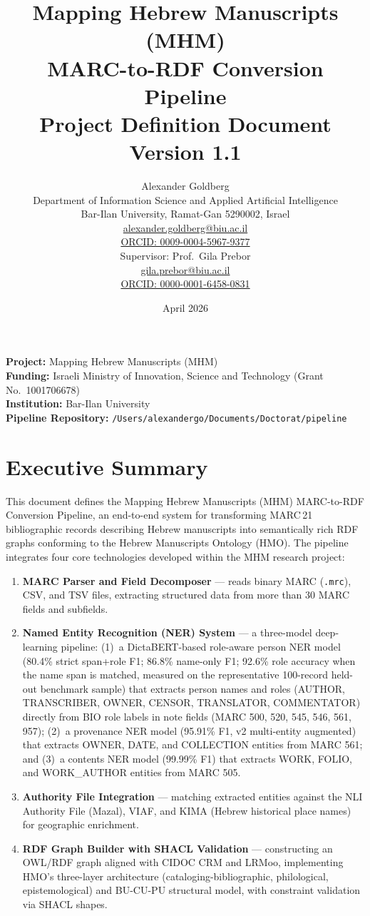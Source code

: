 \documentclass[12pt]{article}
\title{%
  \vspace{-1cm}
  {\LARGE\bfseries Mapping Hebrew Manuscripts (MHM)}\\[0.5cm]
  {\LARGE\bfseries MARC-to-RDF Conversion Pipeline}\\[0.5cm]
  {\Large Project Definition Document}\\[1cm]
  {\large Version 1.1}
}
\author{
  Alexander Goldberg\\
  Department of Information Science and Applied Artificial Intelligence\\
  Bar-Ilan University, Ramat-Gan 5290002, Israel\\[4pt]
  \href{mailto:alexander.goldberg@biu.ac.il}{alexander.goldberg@biu.ac.il}\\
  \href{https://orcid.org/0009-0004-5967-9377}{ORCID: 0009-0004-5967-9377}\\[0.5cm]
  Supervisor: Prof.\ Gila Prebor\\
  \href{mailto:gila.prebor@biu.ac.il}{gila.prebor@biu.ac.il}\\
  \href{https://orcid.org/0000-0001-6458-0831}{ORCID: 0000-0001-6458-0831}
}
\date{April 2026}
\newcommand{\filepath}[1]{\texttt{\small #1}}
\newcommand{\code}[1]{\texttt{#1}}
\begin{document}
\maketitle
\thispagestyle{empty}

\vfill
\noindent\textbf{Project:} Mapping Hebrew Manuscripts (MHM)\\
\textbf{Funding:} Israeli Ministry of Innovation, Science and Technology (Grant No.\ 1001706678)\\
\textbf{Institution:} Bar-Ilan University\\
\textbf{Pipeline Repository:} \filepath{/Users/alexandergo/Documents/Doctorat/pipeline}

\newpage
\tableofcontents
\newpage
\listoffigures
\listoftables
\newpage

\section{Executive Summary}
\label{sec:executive-summary}

This document defines the Mapping Hebrew Manuscripts (MHM) MARC-to-RDF Conversion Pipeline, an end-to-end system for transforming MARC\,21 bibliographic records describing Hebrew manuscripts into semantically rich RDF graphs conforming to the Hebrew Manuscripts Ontology (HMO). The pipeline integrates four core technologies developed within the MHM research project:

\begin{enumerate}
\item \textbf{MARC Parser and Field Decomposer} --- reads binary MARC (\code{.mrc}), CSV, and TSV files, extracting structured data from more than 30 MARC fields and subfields.
\item \textbf{Named Entity Recognition (NER) System} --- a three-model deep-learning pipeline: (1)~a DictaBERT-based role-aware person NER model (80.4\% strict span+role F1; 86.8\% name-only F1; 92.6\% role accuracy when the name span is matched, measured on the representative 100-record held-out benchmark sample) that extracts person names and roles (AUTHOR, TRANSCRIBER, OWNER, CENSOR, TRANSLATOR, COMMENTATOR) directly from BIO role labels in note fields (MARC 500, 520, 545, 546, 561, 957); (2)~a provenance NER model (95.91\% F1, v2 multi-entity augmented) that extracts OWNER, DATE, and COLLECTION entities from MARC 561; and (3)~a contents NER model (99.99\% F1) that extracts WORK, FOLIO, and WORK\_AUTHOR entities from MARC 505.
\item \textbf{Authority File Integration} --- matching extracted entities against the NLI Authority File (Mazal), VIAF, and KIMA (Hebrew historical place names) for geographic enrichment.
\item \textbf{RDF Graph Builder with SHACL Validation} --- constructing an OWL/RDF graph aligned with CIDOC CRM and LRMoo, implementing HMO's three-layer architecture (cataloging-bibliographic, philological, epistemological) and BU-CU-PU structural model, with constraint validation via SHACL shapes.
\end{enumerate}
\end{document}
